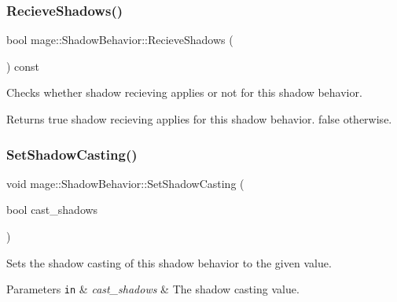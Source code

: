 \subsubsection{\texorpdfstring{Recieve\+Shadows()}{RecieveShadows()}}
{\footnotesize\ttfamily bool mage\+::\+Shadow\+Behavior\+::\+Recieve\+Shadows (\begin{DoxyParamCaption}{ }\end{DoxyParamCaption}) const\hspace{0.3cm}{\ttfamily [noexcept]}}

Checks whether shadow recieving applies or not for this shadow behavior.

\begin{DoxyReturn}{Returns}
{\ttfamily true} shadow recieving applies for this shadow behavior. {\ttfamily false} otherwise. 
\end{DoxyReturn}
\hypertarget{structmage_1_1_shadow_behavior_abaab2edba5be7a15762cd4558c5105ad}{}\label{structmage_1_1_shadow_behavior_abaab2edba5be7a15762cd4558c5105ad} 
\subsubsection{\texorpdfstring{Set\+Shadow\+Casting()}{SetShadowCasting()}}
{\footnotesize\ttfamily void mage\+::\+Shadow\+Behavior\+::\+Set\+Shadow\+Casting (\begin{DoxyParamCaption}\item[{bool}]{cast\+\_\+shadows }\end{DoxyParamCaption})\hspace{0.3cm}{\ttfamily [noexcept]}}

Sets the shadow casting of this shadow behavior to the given value.


\begin{DoxyParams}[1]{Parameters}
\mbox{\tt in}  & {\em cast\+\_\+shadows} & The shadow casting value. \\
\hline
\end{DoxyParams}
\hypertarget{structmage_1_1_shadow_behavior_a6413188d55a94098afc4e529b3e78e0d}{}\label{structmage_1_1_shadow_behavior_a6413188d55a94098afc4e529b3e78e0d} 
